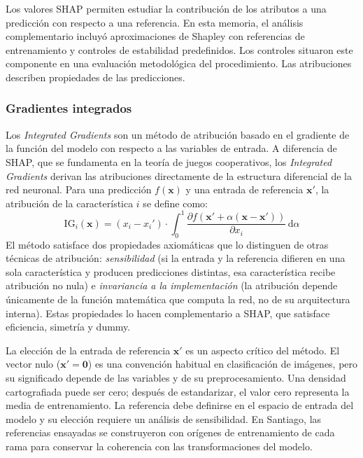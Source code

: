 Los valores SHAP permiten estudiar la contribución de los atributos a una predicción con respecto a una referencia. En esta memoria, el análisis complementario incluyó aproximaciones de Shapley con referencias de entrenamiento y controles de estabilidad predefinidos. Los controles situaron este componente en una evaluación metodológica del procedimiento. Las atribuciones describen propiedades de las predicciones.

\subsubsection{Gradientes integrados}

Los \textit{Integrated Gradients} \cite{sundararajan2017axiomatic} son un método de atribución basado en el gradiente de la función del modelo con respecto a las variables de entrada. A diferencia de SHAP, que se fundamenta en la teoría de juegos cooperativos, los \textit{Integrated Gradients} derivan las atribuciones directamente de la estructura diferencial de la red neuronal. Para una predicción $f(\mathbf{x})$ y una entrada de referencia $\mathbf{x}'$, la atribución de la característica $i$ se define como:
\begin{equation}
    \text{IG}_i(\mathbf{x}) = (x_i - x_i') \cdot \int_0^1 \frac{\partial f\!\left(\mathbf{x}' + \alpha(\mathbf{x} - \mathbf{x}')\right)}{\partial x_i}\,\mathrm{d}\alpha
    \label{eq:ig}
\end{equation}
El método satisface dos propiedades axiomáticas que lo distinguen de otras técnicas de atribución: \textit{sensibilidad} (si la entrada y la referencia difieren en una sola característica y producen predicciones distintas, esa característica recibe atribución no nula) e \textit{invariancia a la implementación} (la atribución depende únicamente de la función matemática que computa la red, no de su arquitectura interna). Estas propiedades lo hacen complementario a SHAP, que satisface eficiencia, simetría y dummy.

La elección de la entrada de referencia $\mathbf{x}'$ es un aspecto crítico del método. El vector nulo ($\mathbf{x}' = \mathbf{0}$) es una convención habitual en clasificación de imágenes, pero su significado depende de las variables y de su preprocesamiento. Una densidad cartografiada puede ser cero; después de estandarizar, el valor cero representa la media de entrenamiento. La referencia debe definirse en el espacio de entrada del modelo y su elección requiere un análisis de sensibilidad. En Santiago, las referencias ensayadas se construyeron con orígenes de entrenamiento de cada rama para conservar la coherencia con las transformaciones del modelo.

